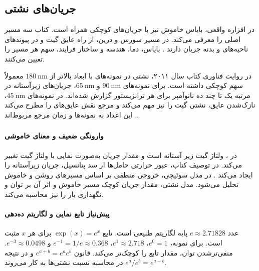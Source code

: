 \subsection{جریان‌های نشتی}
\label{sec:leakage}
در افزاره واقعی، بایاس خاموش نیز با جریان‌های کوچکی همراه است. کتاب
سه مسیر اصلی را معرفی می‌کند.  در مسیر سورس
و درین،  از راه عایق گیت و  در
پیوندهای ناحیه‌های  و بدنه جریان دارند
\cite[بخش  و شکل ]{weste}
\cite[اسلایدهای ۲۱ و ۲۲]{nonideal}. بایاس، دما، هندسه و ساختار فرایند،
سهم هر مسیر را تعیین می‌کنند.

در روایت فناوری کتاب سال ۲۰۱۱، نشتی در نمونه‌های با ابعاد بالاتر از
\(\qty{180}{\nano\metre}\) معمولاً سهم کوچکی داشته است. برای نمونه‌های
\(\qty{90}{\nano\metre}\) و \(\qty{65}{\nano\metre}\)، جریان‌های
زیرآستانه در مرتبه یک تا چند ده نانوآمپر برای هر ترانزیستور گزارش
شده‌اند. در نمونه‌های \(\qty{45}{\nano\metre}\)، نازک‌شدن عایق، نشتی
گیت را نیز مهم می‌کند و مرجع نقش عایق‌های  را مطرح می‌کند
\cite[صفحه ۸۱]{weste}. این اعداد به نمونه‌ها و زمان مرجع مربوط‌اند.

\subsubsection{}
\label{sec:subthreshold-leakage}
\paragraph*{وارونگی ضعیف و معنای خاموشی}
در ، ولتاژ گیت زیر آستانه است و مقدار جریان به‌صورت
نمایی با ولتاژ گیت تغییر می‌کند. در توصیف کتاب، عبور حرارتی حامل‌ها
از سد پتانسیل، جریان زیرآستانه را ایجاد می‌کند
\cite[بخش ]{weste}. در مدل سوئیچی، خروجی منطقی بر
اساس مسیرهای روشن و خاموش تحلیل می‌شود. مدل نشتی، مقدار جریان کوچک
مسیر خاموش و اثر آن بر توان و نگهداری بار را نیز محاسبه می‌کند.

\paragraph*{پیش‌نیاز تابع نمایی و لگاریتم ده‌دهی}
عدد \(e\approx2.71828\) پایه لگاریتم طبیعی است. تابع
\(\exp(x)=e^x\) برای هر \(x\) مثبت است. برای نمونه،
\(e^0=1\)، \(e^1\approx2.718\)، \(e^{-1}=1/e\approx0.368\) و
\(e^{-3}\approx0.0498\). منفی‌ترشدن توان، مقدار تابع را کوچک‌تر می‌کند.
قانون \(e^{a+b}=e^ae^b\) و در نتیجه \(e^a/e^b=e^{a-b}\) در محاسبه
نسبت نشتی‌ها به کار می‌روند.

